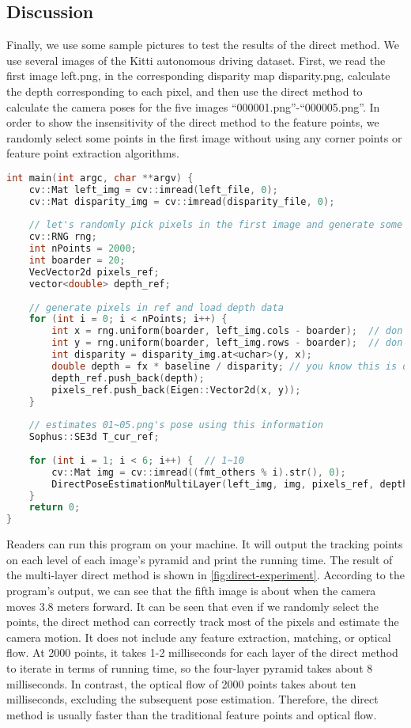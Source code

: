 \subsection{Discussion}
Finally, we use some sample pictures to test the results of the direct method. We use several images of the Kitti {\cite{Geiger2013}} autonomous driving dataset. First, we read the first image left.png, in the corresponding disparity map disparity.png, calculate the depth corresponding to each pixel, and then use the direct method to calculate the camera poses for the five images ``000001.png''-``000005.png''. In order to show the insensitivity of the direct method to the feature points, we randomly select some points in the first image without using any corner points or feature point extraction algorithms.
\begin{lstlisting}[language=c++,caption=slambook2/ch8/direct_method.cpp (part)]
int main(int argc, char **argv) {
	cv::Mat left_img = cv::imread(left_file, 0);
	cv::Mat disparity_img = cv::imread(disparity_file, 0);
	
	// let's randomly pick pixels in the first image and generate some 3d points in the first image's frame
	cv::RNG rng;
	int nPoints = 2000;
	int boarder = 20;
	VecVector2d pixels_ref;
	vector<double> depth_ref;
	
	// generate pixels in ref and load depth data
	for (int i = 0; i < nPoints; i++) {
		int x = rng.uniform(boarder, left_img.cols - boarder);  // don't pick pixels close to boarder
		int y = rng.uniform(boarder, left_img.rows - boarder);  // don't pick pixels close to boarder
		int disparity = disparity_img.at<uchar>(y, x);
		double depth = fx * baseline / disparity; // you know this is disparity to depth
		depth_ref.push_back(depth);
		pixels_ref.push_back(Eigen::Vector2d(x, y));
	}
	
	// estimates 01~05.png's pose using this information
	Sophus::SE3d T_cur_ref;
	
	for (int i = 1; i < 6; i++) {  // 1~10
		cv::Mat img = cv::imread((fmt_others % i).str(), 0);
		DirectPoseEstimationMultiLayer(left_img, img, pixels_ref, depth_ref, T_cur_ref);
	}
	return 0;
}
\end{lstlisting}

Readers can run this program on your machine. It will output the tracking points on each level of each image's pyramid and print the running time. The result of the multi-layer direct method is shown in \autoref{fig:direct-experiment}. According to the program's output, we can see that the fifth image is about when the camera moves 3.8 meters forward. It can be seen that even if we randomly select the points, the direct method can correctly track most of the pixels and estimate the camera motion. It does not include any feature extraction, matching, or optical flow. At 2000 points, it takes 1-2 milliseconds for each layer of the direct method to iterate in terms of running time, so the four-layer pyramid takes about 8 milliseconds. In contrast, the optical flow of 2000 points takes about ten milliseconds, excluding the subsequent pose estimation. Therefore, the direct method is usually faster than the traditional feature points and optical flow.


